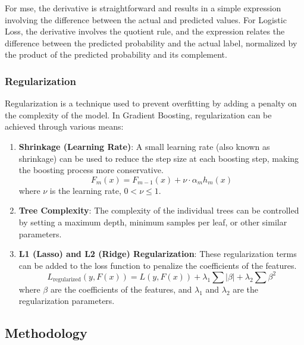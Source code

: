 For \gls{mse}, the derivative is straightforward and results in a simple expression involving the difference between the actual and predicted values.
For Logistic Loss, the derivative involves the quotient rule, and the expression relates the difference between the predicted probability and the actual label, normalized by the product of the predicted probability and its complement.


\subsubsection{Regularization}

Regularization is a technique used to prevent overfitting by adding a penalty on the complexity of the model. In Gradient Boosting, regularization can be achieved through various means:

\begin{enumerate}
    \item \textbf{Shrinkage (Learning Rate)}: 
    A small learning rate (also known as shrinkage) can be used to reduce the step size at each boosting step, making the boosting process more conservative.
    \[ F_m(x) = F_{m-1}(x) + \nu \cdot \alpha_m h_m(x) \]
    where \( \nu \) is the learning rate, \( 0 < \nu \leq 1 \).

    \item \textbf{Tree Complexity}:
    The complexity of the individual trees can be controlled by setting a maximum depth, minimum samples per leaf, or other similar parameters.

    \item \textbf{L1 (Lasso) and L2 (Ridge) Regularization}:
    These regularization terms can be added to the loss function to penalize the coefficients of the features.
    \[ L_{\text{regularized}}(y, F(x)) = L(y, F(x)) + \lambda_1 \sum | \beta | + \lambda_2 \sum \beta^2 \]
    where \( \beta \) are the coefficients of the features, and \( \lambda_1 \) and \( \lambda_2 \) are the regularization parameters.
\end{enumerate}


\subsection{Methodology}


